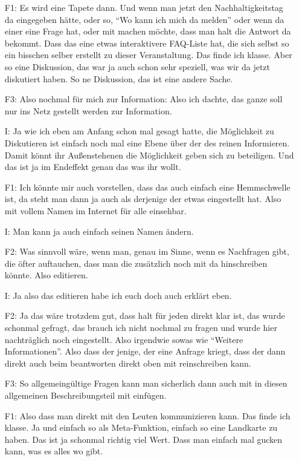 \begin{itemize}
    \item[F1:] Es wird eine Tapete dann. Und wenn man jetzt den Nachhaltigkeitstag da eingegeben h{\"a}tte, oder so, "`Wo kann ich mich da melden"' oder wenn da einer eine Frage hat, oder mit machen m{\"o}chte, dass man halt die Antwort da bekommt. Dass das eine etwas interaktivere FAQ-Liste hat, die sich selbst so ein bisschen selber erstellt zu dieser Veranstaltung. Das finde ich klasse. Aber so eine Diskussion, das war ja auch schon sehr speziell, was wir da jetzt diskutiert haben. So ne Diskussion, das ist eine andere Sache.
    \item[F3:] Also nochmal f{\"u}r mich zur Information: Also ich dachte, das ganze soll nur ins Netz gestellt werden zur Information.
    \item[I:] Ja wie ich eben am Anfang schon mal gesagt hatte, die M{\"o}glichkeit zu Diskutieren ist einfach noch mal eine Ebene {\"u}ber der des reinen Informieren. Damit k{\"o}nnt ihr Au{\ss}enstehenen die M{\"o}glichkeit geben sich zu beteiligen. Und das ist ja im Endeffekt genau das was ihr wollt.
    \item[F1:] Ich k{\"o}nnte mir auch vorstellen, dass das auch einfach eine Hemmschwelle ist, da steht man dann ja auch als derjenige der etwas eingestellt hat. Also mit vollem Namen im Internet f{\"u}r alle einsehbar.
    \item[I:] Man kann ja auch einfach seinen Namen {\"a}ndern.
    \item[F2:] Was sinnvoll w{\"a}re, wenn man, genau im Sinne, wenn es Nachfragen gibt, die {\"o}fter auftauchen, dass man die zus{\"a}tzlich noch mit da hinschreiben k{\"o}nnte. Also editieren.
    \item[I:] Ja also das editieren habe ich euch doch auch erkl{\"a}rt eben.
    \item[F2:] Ja das w{\"a}re trotzdem gut, dass halt f{\"u}r jeden direkt klar ist, das wurde schonmal gefragt, das brauch ich nicht nochmal zu fragen und wurde hier nachtr{\"a}glich noch eingestellt. Also irgendwie sowas wie "`Weitere Informationen"'. Also dass der jenige, der eine Anfrage kriegt, dass der dann direkt auch beim beantworten direkt oben mit reinschreiben kann.
    \item[F3:] So allgemeing{\"u}ltige Fragen kann man sicherlich dann auch mit in diesen allgemeinen Beschreibungsteil mit einf{\"u}gen.
    \item[F1:] Also dass man direkt mit den Leuten kommunizieren kann. Das finde ich klasse. Ja und einfach so als Meta-Funktion, einfach so eine Landkarte zu haben. Das ist ja schonmal richtig viel Wert. Dass man einfach mal gucken kann, was es alles wo gibt.

\end{itemize}
